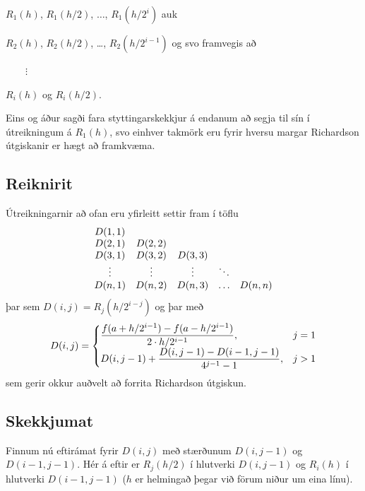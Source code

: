 \documentclass[letterpaper,10pt,icelandic]{sphinxmanual}
\begin{document}
\begin{DUlineblock}{0em}
\item[] \(R_1(h)\), \(R_1(h/2)\), \(\ldots\), \(R_1(h/2^i)\)
auk
\item[] \(R_2(h)\), \(R_2(h/2)\), …, \(R_2(h/2^{i-1})\) og svo
framvegis að
\item[] \(\qquad \vdots\)
\item[] \(R_i(h)\) og \(R_i(h/2)\).
\end{DUlineblock}

Eins og áður sagði fara styttingarskekkjur á endanum að segja til sín í
útreikningum á \(R_1(h)\), svo einhver takmörk eru fyrir hversu
margar Richardson útgiskanir er hægt að framkvæma.


\subsection{Reiknirit}
\label{kafli04:reiknirit}
Útreikningarnir að ofan eru yfirleitt settir fram í töflu
\begin{gather}
\begin{split}\begin{array}{ccccc}
    D(1,1) &   &   &   &   \\
    D(2,1) & D(2,2) &  &  &  \\
    D(3,1) & D(3,2) & D(3,3) & & \\
    \vdots & \vdots & \vdots & \ddots & \\
    D(n,1) & D(n,2) & D(n,3) & \ldots & D(n,n)
  \end{array}\end{split}\notag
\end{gather}
þar sem \(D(i,j) = R_j(h/2^{i-j})\) og þar með
\begin{gather}
\begin{split}D(i,j) = \begin{cases}
    \dfrac{f(a+h/2^{i-1})-f(a-h/2^{i-1})}{2\cdot h/2^{i-1}}, & j = 1 \\
    D(i,j-1) + \dfrac{D(i,j-1)-D(i-1,j-1)}{4^{j-1}-1}, & j > 1
  \end{cases}\end{split}\notag
\end{gather}
sem gerir okkur auðvelt að forrita Richardson útgiskun.


\subsection{Skekkjumat}
\label{kafli04:id5}
Finnum nú eftirámat fyrir \(D(i,j)\) með stærðunum
\(D(i,j-1)\) og \(D(i-1,j-1)\). Hér á eftir er
\(R_j(h/2)\) í hlutverki \(D(i,j-1)\) og \(R_i(h)\) í
hlutverki \(D(i-1,j-1)\)
(\(h\) er helmingað þegar við förum niður um eina línu).
\end{document}
